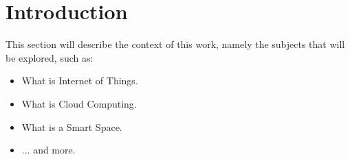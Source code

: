 \section{Introduction}
\label{sec:Introduction}
This section will describe the context of this work, namely the subjects that will be explored, such as:
\begin{itemize}
  \item What is Internet of Things.
  \item What is Cloud Computing.
  \item What is a Smart Space.
  \item ... and more.
\end{itemize}
